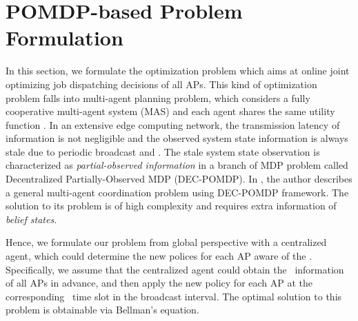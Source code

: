 \section{POMDP-based Problem Formulation}
In this section, we formulate the optimization problem which aims at online joint optimizing job dispatching decisions of all APs.
This kind of optimization problem falls into multi-agent planning problem, which considers a fully cooperative multi-agent system (MAS) and each agent shares the same utility function .
In an extensive edge computing network, the transmission latency of information is not negligible and the observed system state information is always stale due to periodic broadcast and \brlatency.
The stale system state observation is characterized as \emph{partial-observed information} in a branch of MDP problem called Decentralized Partially-Observed MDP (DEC-POMDP).
In , the author describes a general multi-agent coordination problem using DEC-POMDP framework. The solution to its problem is of high complexity and requires extra information of \emph{belief states}.

Hence, we formulate our problem from global perspective with a centralized agent, which could determine the new polices for each AP aware of the \brlatency.
Specifically, we assume that the centralized agent could obtain the \brlatency~information of all APs in advance, and then apply the new policy for each AP at the corresponding \brlatency~time slot in the broadcast interval.
The optimal solution to this problem is obtainable via Bellman's equation.


